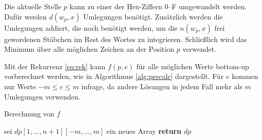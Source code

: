 \documentclass[a4paper,10pt,ngerman]{scrartcl}
\begin{document}
Die aktuelle Stelle $p$ kann zu einer der Hex-Ziffern 0--F umgewandelt werden. Dafür werden $d(w_p, x)$ Umlegungen benötigt. Zusätzlich werden die Umlegungen addiert, die noch benötigt werden, um die $n(w_p, x)$ frei gewordenen Stäbchen im Rest des Wortes zu integrieren.
Schließlich wird das Minimum über alle möglichen Zeichen an der Position $p$ verwendet. 

Mit der Rekurrenz \ref{eq:rek} kann $f(p, e)$ für alle möglichen Werte bottom-up vorberechnet werden, wie in Algorithmus \ref{alg:precalc} dargestellt. Für $e$ kommen nur Werte $-m \leq e \leq m$ infrage, da andere Lösungen in jedem Fall mehr als $m$ Umlegungen verwenden. 
\begin{algorithm}
\caption{Berechnung von $f$}
\label{alg:precalc}
\begin{algorithmic}[1]
    \State sei $dp[1, ..., n+1][-m, ..., m]$ ein neues Array
        \EndFor 
    \EndFor
    \State \textbf{return} $dp$
\EndProcedure
\end{algorithmic}
\end{algorithm} 
\end{document}
